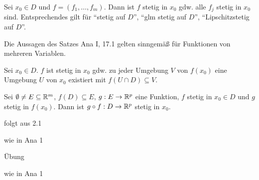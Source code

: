 \documentclass[a4paper,twoside,DIV15,BCOR12mm]{scrbook}
\begin{document}
\begin{satz}
\begin{liste}
\item Sei $x_0 \in D$ und $f = (f_1,\ldots,f_m).$ Dann ist $f$ stetig in $x_0$ gdw. alle $f_j$ stetig in $x_0$ sind. Entsprechendes gilt für "`stetig auf $D$"', "`glm stetig auf $D$"', "`Lipschitzstetig auf $D$"'.
\item Die Aussagen des Satzes Ana I, 17.1 gelten sinngemäß für Funktionen von mehreren Variablen.
\item Sei $x_0 \in D$. $f$ ist stetig in $x_0$ gdw. zu jeder Umgebung $V$ von $f(x_0)$ eine Umgebung $U$ von $x_0$ existiert mit $f(U \cap D) \subseteq V$.
\item Sei $\emptyset \ne E \subseteq \mathbb{R}^m$, $f(D) \subseteq E$, $g: E \to \mathbb{R}^p$ eine Funktion, $f$ stetig in $x_0 \in D$ und $g$ stetig in $f(x_0)$. Dann ist $g \circ f: D \to \mathbb{R}^p$ stetig in $x_0$.
\end{liste}
\end{satz}

\begin{beweise}
\item folgt aus 2.1
\item wie in Ana 1
\item Übung
\item wie in Ana 1
\end{beweise}
\end{document}

